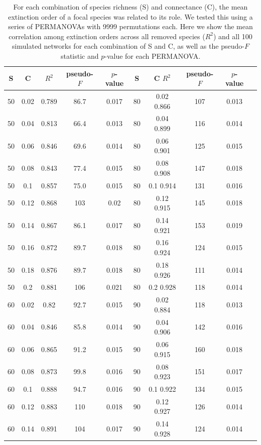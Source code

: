 \documentclass[12pt]{article}
\begin{document}
	\begin{table}[h!]
		\caption{For each combination of species richness (S) and connectance (C), the mean extinction order of a focal species was related to its role. We tested this using a series of PERMANOVAs with 9999 permutations each. Here we show the mean correlation among extinction orders across all removed species ($R^2$) and all 100 simulated networks for each combination of S and C, as well as the pseudo-$F$ statistic and $p$-value for each PERMANOVA.}
		\label{permtable}
		\begin{tabular}{c c | c | c c ||c c | c | c c |}
			S	&	C	&	$R^2$	&	pseudo-$F$	&	$p$-value	&	S	&	C	$R^2$	&	pseudo-$F$	&	$p$-value\\ 
			\hline
			50	&	0.02	&	0.789	&	86.7	&	0.017	&	80	&	0.02	0.866	&	107	&	0.013\\ 
			50	&	0.04	&	0.813	&	66.4	&	0.013	&	80	&	0.04	0.899	&	116	&	0.014\\ 
			50	&	0.06	&	0.846	&	69.6	&	0.014	&	80	&	0.06	0.901	&	125	&	0.015\\ 
			50	&	0.08	&	0.843	&	77.4	&	0.015	&	80	&	0.08	0.908	&	147	&	0.018\\ 
			50	&	0.1	&	0.857	&	75.0	&	0.015	&	80	&	0.1	0.914	&	131	&	0.016\\ 
			50	&	0.12	&	0.868	&	103	&	0.02	&	80	&	0.12	0.915	&	145	&	0.018\\ 
			50	&	0.14	&	0.867	&	86.1	&	0.017	&	80	&	0.14	0.921	&	153	&	0.019\\ 
			50	&	0.16	&	0.872	&	89.7	&	0.018	&	80	&	0.16	0.924	&	124	&	0.015\\ 
			50	&	0.18	&	0.876	&	89.7	&	0.018	&	80	&	0.18	0.926	&	111	&	0.014\\ 
			50	&	0.2	&	0.881	&	106	&	0.021	&	80	&	0.2	0.928	&	118	&	0.014\\ 
			60	&	0.02	&	0.82	&	92.7	&	0.015	&	90	&	0.02	0.884	&	118	&	0.013\\ 
			60	&	0.04	&	0.846	&	85.8	&	0.014	&	90	&	0.04	0.906	&	142	&	0.016\\ 
			60	&	0.06	&	0.865	&	91.2	&	0.015	&	90	&	0.06	0.915	&	160	&	0.018\\ 
			60	&	0.08	&	0.873	&	99.8	&	0.016	&	90	&	0.08	0.923	&	151	&	0.017\\ 
			60	&	0.1	&	0.888	&	94.7	&	0.016	&	90	&	0.1	0.922	&	134	&	0.015\\ 
			60	&	0.12	&	0.883	&	110	&	0.018	&	90	&	0.12	0.927	&	126	&	0.014\\ 
			60	&	0.14	&	0.891	&	104	&	0.017	&	90	&	0.14	0.928	&	124	&	0.014\\ 

\end{tabular}
\end{table}
\end{document}
